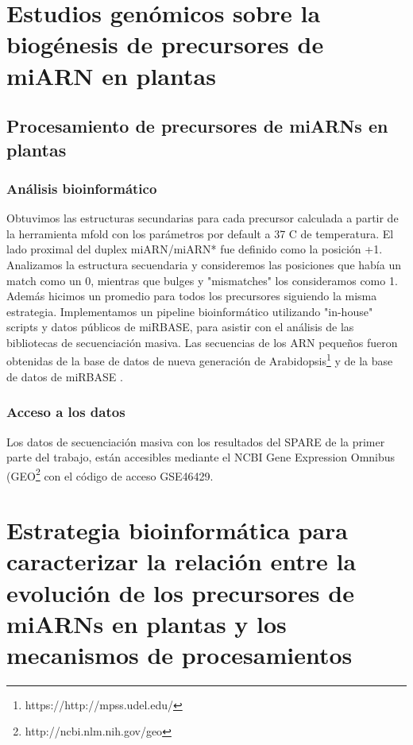 \section{Estudios genómicos sobre la biogénesis de precursores de miARN en plantas}

\subsection{Procesamiento de precursores de miARNs en plantas}

\subsubsection{Análisis bioinformático}

Obtuvimos las estructuras secundarias para cada precursor calculada a partir de la herramienta mfold \citep{pmid12824337} con los parámetros por default a 37 \degree C de temperatura.
El lado proximal del duplex miARN/miARN* fue definido como la posición +1.
Analizamos la estructura secuendaria y consideremos las posiciones que había un match como un 0, mientras que bulges y "mismatches" los consideramos como 1.
Además hicimos un promedio para todos los precursores siguiendo la misma estrategia.
Implementamos un pipeline bioinformático utilizando "in-house" scripts y datos públicos de miRBASE, para asistir con el análisis de las bibliotecas de secuenciación masiva.
Las secuencias de los ARN pequeños fueron obtenidas de la base de datos de nueva generación de Arabidopsis\footnote{https://http://mpss.udel.edu/} \citep{pmid25120269} y  de la base de datos de miRBASE \citep{Kozomara2014}.

\subsubsection{Acceso a los datos}
Los datos de secuenciación masiva con los resultados del SPARE de la primer parte del trabajo, están accesibles mediante el NCBI Gene Expression Omnibus (GEO\footnote{http://ncbi.nlm.nih.gov/geo} con el código de acceso GSE46429.

\section{Estrategia bioinformática para caracterizar la relación entre la evolución de los precursores de miARNs en plantas y los mecanismos de procesamientos} \label{ref_evolution}

